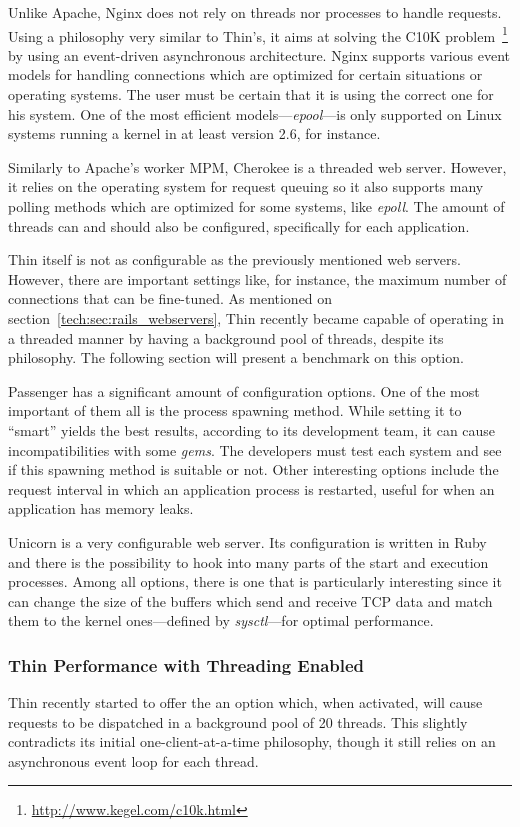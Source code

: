 Unlike Apache, Nginx does not rely on threads nor processes to handle requests. Using a philosophy very similar to Thin's, it aims at solving the C10K problem~\footnote{\url{http://www.kegel.com/c10k.html}} by using an event-driven asynchronous architecture. Nginx supports various event models for handling connections which are optimized for certain situations or operating systems. The user must be certain that it is using the correct one for his system. One of the most efficient models---\textit{epool}---is only supported on Linux systems running a kernel in at least version 2.6, for instance.

Similarly to Apache's worker MPM, Cherokee is a threaded web server. However, it relies on the operating system for request queuing so it also supports many polling methods which are optimized for some systems, like \textit{epoll}. The amount of threads can and should also be configured, specifically for each application.

Thin itself is not as configurable as the previously mentioned web servers. However, there are important settings like, for instance, the maximum number of connections that can be fine-tuned. As mentioned on section~\ref{tech:sec:rails_webservers}, Thin recently became capable of operating in a threaded manner by having a background pool of threads, despite its philosophy. The following section will present a benchmark on this option.

Passenger has a significant amount of configuration options. One of the most important of them all is the process spawning method. While setting it to ``smart'' yields the best results, according to its development team, it can cause incompatibilities with some \textit{gems}. The developers must test each system and see if this spawning method is suitable or not. Other interesting options include the request interval in which an application process is restarted, useful for when an application has memory leaks.

Unicorn is a very configurable web server. Its configuration is written in Ruby and there is the possibility to hook into many parts of the start and execution processes. Among all options, there is one that is particularly interesting since it can change the size of the buffers which send and receive TCP data and match them to the kernel ones---defined by \textit{sysctl}---for optimal performance.

\subsubsection{Thin Performance with Threading Enabled}
Thin recently started to offer the an option which, when activated, will cause requests to be dispatched in a background pool of 20 threads. This slightly contradicts its initial one-client-at-a-time philosophy, though it still relies on an asynchronous event loop for each thread.


